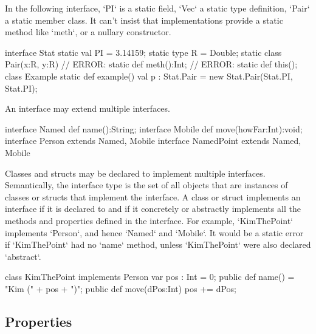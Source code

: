 \begin{ex}
In the following interface, \xcd`PI` is a static field, 
\xcd`Vec` a static type definition, 
\xcd`Pair` a static member class.
It can't insist that implementations provide a static method 
like \xcd`meth`, or a nullary constructor.
\begin{xten}
interface Stat {
  static val PI = 3.14159; 
  static type R = Double;
  static class Pair(x:R, y:R) {}
  // ERROR: static def meth():Int;
  // ERROR: static def this();
}
class Example {
  static def example() {
     val p : Stat.Pair = new Stat.Pair(Stat.PI, Stat.PI);
  }
}
\end{xten}
%

\end{ex}

An interface may extend multiple interfaces.  
\begin{xten}
interface Named {
  def name():String;
}
interface Mobile {
  def move(howFar:Int):void;
}
interface Person extends Named, Mobile {}
interface NamedPoint extends Named, Mobile {} 
\end{xten}
%


Classes and structs may be declared to implement multiple interfaces. Semantically, the
interface type is the set of all objects that are instances of classes
or structs that
implement the interface. A class or struct implements an interface if it is declared to
and if it concretely or abstractly implements all the methods and properties
defined in the interface. For example, \xcd`KimThePoint` implements
\xcd`Person`, and hence \xcd`Named` and \xcd`Mobile`. It would be a static
error if \xcd`KimThePoint` had no \xcd`name` method, unless \xcd`KimThePoint` were also
declared \xcd`abstract`.

\begin{xten}
class KimThePoint implements Person {
   var pos : Int = 0;
   public def name() = "Kim (" + pos + ")";
   public def move(dPos:Int) { pos += dPos; }
}
\end{xten}
%


\subsection{Properties}
\label{properties}

